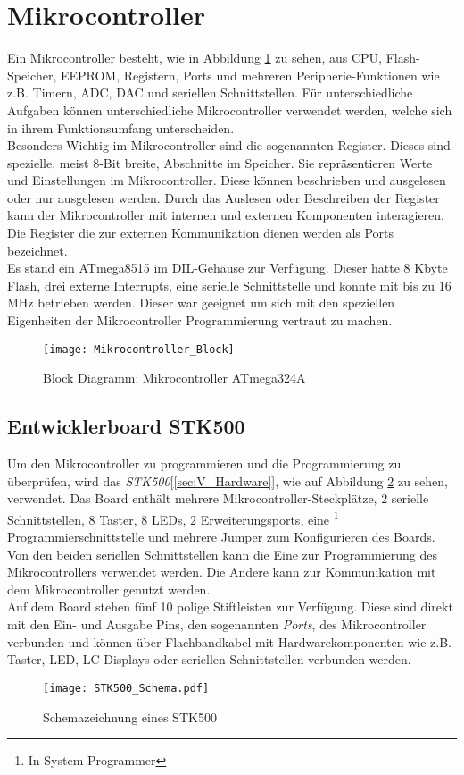 \section{Mikrocontroller}
\label{sec:Mikrocontroller}
Ein Mikrocontroller besteht, wie in Abbildung \ref{fig:uC_Blockdiagramm} zu sehen, aus CPU, Flash-Speicher, EEPROM, Registern, Ports und mehreren Peripherie-Funktionen wie z.B. Timern, ADC, DAC und seriellen Schnittstellen. Für unterschiedliche Aufgaben können unterschiedliche Mikrocontroller verwendet werden, welche sich in ihrem Funktionsumfang unterscheiden.\\
Besonders Wichtig im Mikrocontroller sind die sogenannten Register. Dieses sind spezielle, meist 8-Bit breite, Abschnitte im Speicher. Sie repräsentieren Werte und Einstellungen im Mikrocontroller. Diese können  beschrieben und ausgelesen oder nur ausgelesen werden. Durch das Auslesen oder Beschreiben der Register kann der Mikrocontroller mit internen und externen Komponenten interagieren. Die Register die zur externen Kommunikation dienen werden als Ports bezeichnet. \\
Es stand ein ATmega8515 \cite{atmel:8515} im DIL-Gehäuse zur Verfügung. Dieser hatte 8 Kbyte Flash, drei externe Interrupts, eine serielle Schnittstelle und konnte mit bis zu 16 MHz betrieben werden. 
Dieser war geeignet um sich mit den speziellen Eigenheiten der Mikrocontroller Programmierung vertraut zu machen.
\begin{figure}[htb]
\centering
\texttt{[image: Mikrocontroller\_Block]}
\caption{Block Diagramm: Mikrocontroller ATmega324A}\cite{atmel:ug_324A}
\label{fig:uC_Blockdiagramm}
\end{figure}

\subsection{Entwicklerboard STK500}
\label{sec:STK500}
Um den Mikrocontroller zu programmieren und die Programmierung zu überprüfen, wird das  \emph{STK500}[\ref{sec:V_Hardware}], wie auf Abbildung \ref{fig:STK500} zu sehen, verwendet. Das Board enthält mehrere Mikrocontroller-Steckplätze, 2 serielle Schnittstellen, 8 Taster, 8 LEDs, 2 Erweiterungsports, eine \footnote{In System Programmer} Programmierschnittstelle und mehrere Jumper zum Konfigurieren des Boards.\\
Von den beiden seriellen Schnittstellen kann die Eine zur Programmierung des Mikrocontrollers verwendet werden. Die Andere kann zur Kommunikation mit dem Mikrocontroller genutzt werden.\\
Auf dem Board stehen fünf 10 polige Stiftleisten 
zur Verfügung. Diese sind direkt mit den Ein- und Ausgabe Pins, den sogenannten \emph{Ports}, des Mikrocontroller verbunden und können über Flachbandkabel mit Hardwarekomponenten wie z.B. Taster, LED, LC-Displays oder seriellen Schnittstellen verbunden werden.
\begin{figure}[htb]
\centering
\texttt{[image: STK500\_Schema.pdf]}
\caption{Schemazeichnung eines STK500}
\label{fig:STK500}
\citep{atmel:ug_STK500}
\end{figure}


